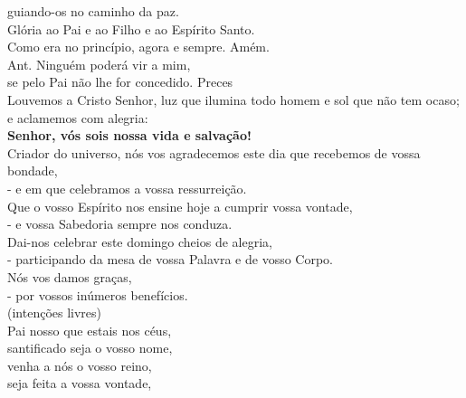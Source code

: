 \documentclass{book}
\begin{document}
\begin{center}
    guiando-os no caminho da paz.
    \vspace{.2cm} \\
    \textsuperscript{\underline{\hspace{.06in}}} Glória ao Pai e ao Filho e ao Espírito Santo.\ \textsuperscript{\gresixstar{}} \\
    Como era no princípio, agora e sempre. Amém.
    \vspace{.2cm} \\
    \textcolor{VioletRed2}{Ant.} Ninguém poderá vir a mim, \\
    se pelo Pai não lhe for concedido.
    \newpage
    \textcolor{VioletRed2}{Preces}
    \vspace{.2cm} \\
    Louvemos a Cristo Senhor, luz que ilumina todo homem e sol que não tem ocaso; e aclamemos com alegria:
    \vspace{.2cm} \\
    \RbarRed{} \textbf{Senhor, vós sois nossa vida e salvação!}
    \vspace{.2cm} \\
    Criador do universo, nós vos agradecemos este dia que recebemos de vossa bondade, \\
    -  e em que celebramos a vossa ressurreição. \RbarRed{}
    \vspace{.2cm} \\
    Que o vosso Espírito nos ensine hoje a cumprir vossa vontade, \\
    -  e vossa Sabedoria sempre nos conduza. \RbarRed{}
    \vspace{.2cm} \\
    Dai-nos celebrar este domingo cheios de alegria, \\
    - participando da mesa de vossa Palavra e de vosso Corpo. \RbarRed{}
    \vspace{.2cm} \\
    Nós vos damos graças, \\
    - por vossos inúmeros benefícios. \RbarRed{}
    \vspace{.2cm} \\
    \textcolor{VioletRed2}{\small (intenções livres)}
    \vspace{.2cm} \\
    Pai nosso que estais nos céus, \\
    santificado seja o vosso nome, \\
    venha a nós o vosso reino, \\
    seja feita a vossa vontade, \\

\end{center}
\end{document}
